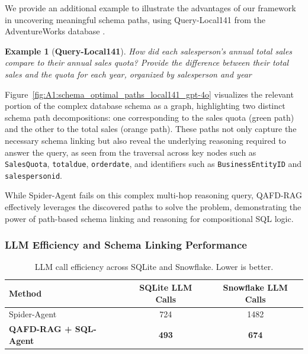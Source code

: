 \documentclass{article} %
\newtheorem{example}{Example}
\begin{document}
We provide an additional example to illustrate the advantages of our framework in uncovering meaningful schema paths, using Query-Local141 from the AdventureWorks database \citep{lei2025spider}.
%
\begin{example}[\textbf{Query-Local141}]
 How did each salesperson's annual total sales compare to their annual sales quota? Provide the difference between their total sales and the quota for each year, organized by salesperson and year   
\end{example}
Figure~\ref{fig:A1:schema_optimal_paths_local141_gpt-4o} visualizes the relevant portion of the complex database schema as a graph, highlighting two distinct schema path decompositions: one corresponding to the sales quota (green path) and the other to the total sales (orange path). These paths not only capture the necessary schema linking but also reveal the underlying reasoning required to answer the query, as seen from the traversal across key nodes such as \texttt{SalesQuota}, \texttt{totaldue}, \texttt{orderdate}, and identifiers such as  \texttt{BusinessEntityID} and \texttt{salespersonid}.

While Spider-Agent fails on this complex multi-hop reasoning query, QAFD-RAG effectively leverages the discovered paths to solve the problem, demonstrating the power of path-based schema linking and reasoning for compositional SQL logic.


\subsubsection{{LLM Efficiency and Schema Linking Performance}}

\begin{table}[t]
\centering
\caption{{LLM call efficiency across SQLite and Snowflake. Lower is better.}}
\label{tab:llm_efficiency}  %
{
\begin{tabular}{lcc}
\toprule
\textbf{Method} & \textbf{SQLite LLM Calls} & \textbf{Snowflake LLM Calls} \\
\midrule
Spider-Agent & 724 & 1482 \\
\textbf{QAFD-RAG + SQL-Agent} & \textbf{493} & \textbf{674} \\
\bottomrule
\end{tabular}
}
\end{table}
\end{document}
